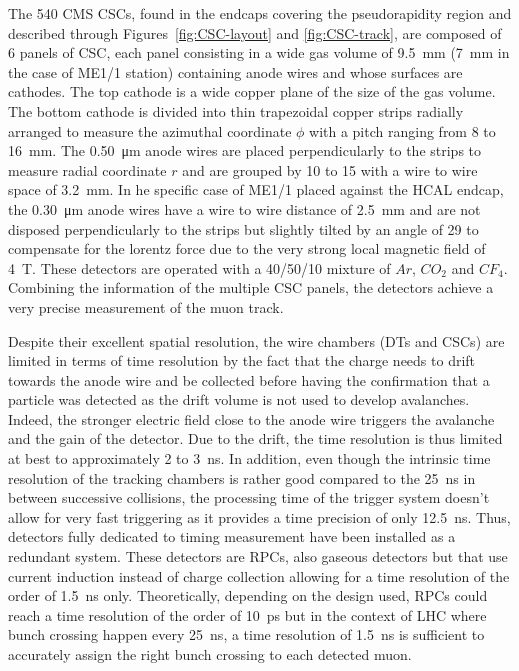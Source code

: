 	The 540 CMS CSCs, found in the endcaps covering the pseudorapidity region  and described through Figures~\ref{fig:CSC-layout} and \ref{fig:CSC-track}, are composed of 6 panels of CSC, each panel consisting in a wide gas volume of \SI{9.5}{mm} (\SI{7}{mm} in the case of ME1/1 station) containing anode wires and whose surfaces are cathodes. The top cathode is a wide copper plane of the size of the gas volume. The bottom cathode is divided into thin trapezoidal copper strips radially arranged to measure the azimuthal coordinate $\phi$ with a pitch ranging from 8 to \SI{16}{mm}. The \SI{0.50}{\micro m} anode wires are placed perpendicularly to the strips to measure radial coordinate $r$ and are grouped by 10 to 15 with a wire to wire space of \SI{3.2}{mm}. In he specific case of ME1/1 placed against the HCAL endcap, the \SI{0.30}{\micro m} anode wires have a wire to wire distance of \SI{2.5}{mm} and are not disposed perpendicularly to the strips but slightly tilted by an angle of \SI{29}{\deg} to compensate for the lorentz force due to the very strong local magnetic field of \SI{4}{T}. These detectors are operated with a 40/50/10 mixture of $Ar$, $CO_2$ and $CF_4$. Combining the information of the multiple CSC panels, the detectors achieve a very precise measurement of the muon track.
	
	Despite their excellent spatial resolution, the wire chambers (DTs and CSCs) are limited in terms of time resolution by the fact that the charge needs to drift towards the anode wire and be collected before having the confirmation that a particle was detected as the drift volume is not used to develop avalanches. Indeed, the stronger electric field close to the anode wire triggers the avalanche and the gain of the detector. Due to the drift, the time resolution is thus limited at best to approximately 2 to \SI{3}{ns}. In addition, even though the intrinsic time resolution of the tracking chambers is rather good compared to the \SI{25}{ns} in between successive collisions, the processing time of the trigger system doesn't allow for very fast triggering as it provides a time precision of only \SI{12.5}{ns}. Thus, detectors fully dedicated to timing measurement have been installed as a redundant system. These detectors are RPCs, also gaseous detectors but that use current induction instead of charge collection allowing for a time resolution of the order of \SI{1.5}{ns} only. Theoretically, depending on the design used, RPCs could reach a time resolution of the order of \SI{10}{ps} but in the context of LHC where bunch crossing happen every \SI{25}{ns}, a time resolution of \SI{1.5}{ns} is sufficient to accurately assign the right bunch crossing to each detected muon.
	
